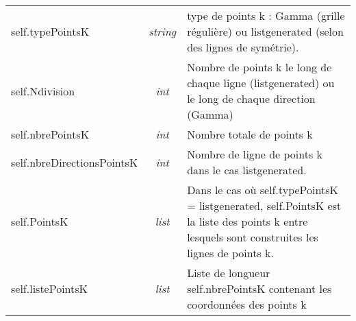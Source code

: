 \documentclass[10pt,a4paper,fleqn]{article}
\begin{document}
\begin{tabularx}{\textwidth}{|l|>{\itshape}c|X|}
	\hline
	self.typePointsK & string & type de points k : Gamma (grille régulière) ou listgenerated (selon des
	lignes de symétrie). \\
	self.Ndivision & int & Nombre de points k le long de chaque ligne (listgenerated) ou le long de
	chaque direction (Gamma) \\
	self.nbrePointsK & int & Nombre totale de points k \\
	self.nbreDirectionsPointsK & int & Nombre de ligne de points k dans le cas listgenerated. \\
	self.PointsK & list & Dans le cas où self.typePointsK = listgenerated, self.PointsK est la liste
	des points k entre lesquels sont construites les lignes de points k. \\
	self.listePointsK & list & Liste de longueur self.nbrePointsK contenant les coordonnées des points
	k \\
	\hline
\end{tabularx}
\end{document}
